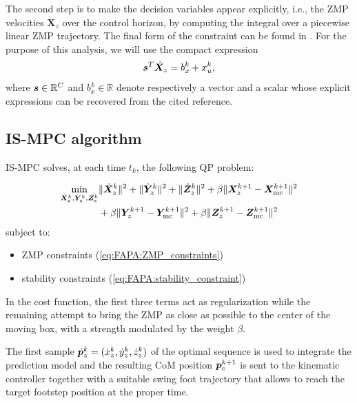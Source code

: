 The second step is to make the decision variables appear explicitly, i.e., the ZMP velocities $\dot{\bm{X}}_z$ over the control horizon, by computing the integral over a piecewise linear ZMP trajectory. The final form of the constraint can be found in \cite{ScDeLaOr:20}. For the purpose of this analysis, we will use the compact expression
\begin{equation}\label{eq:FAPA:stability_constraint}
    {\bm{s}}^T \dot{\bm{X}}_z = b_x^k + x_u^k,
\end{equation}
where ${\bm{s}}\in\mathbb{R}^C$ and $b_x^k\in\mathbb{R}$ denote respectively a vector and a scalar whose explicit expressions can be recovered from the cited reference.

\subsection{IS-MPC algorithm}

IS-MPC solves, at each time $t_k$, the following QP problem:
\begin{braced}
\begin{equation*}\begin{split}
\min_{\dot{\bm{X}}_\text{z}^k, \dot{\bm{Y}}_\text{z}^k, \dot{\bm{Z}}_\text{z}^k}
&\|\dot{\bm{X}}_z^k\|^2 + \|\dot{\bm{Y}}_z^k\|^2 + \|\dot{\bm{Z}}_z^k\|^2+\beta \|\bm{X}_z^{k+1} - {\bm{X}}_{\rm mc}^{k+1}\|^2 \\& + \beta \|\bm{Y}_z^{k+1} - {\bm{Y}}_{\rm mc}^{k+1}\|^2 + \beta \|\bm{Z}_z^{k+1} - {\bm{Z}}_{\rm mc}^{k+1}\|^2 \\
\end{split}\end{equation*}
\hspace{0.25cm} subject to:
\begin{itemize}
\item ZMP constraints (\ref{eq:FAPA:ZMP_constraints})
\item stability constraints (\ref{eq:FAPA:stability_constraint})
\end{itemize}
\end{braced}

\medskip
In the cost function, the first three terms act as regularization while the remaining attempt to bring the ZMP as close as possible to the center of the moving box, with a strength modulated by the weight $\beta$.

The first sample $\dot {{\bm{p}}}_z^k = (\dot x_z^k, \dot y_z^k, \dot z_z^k)$ of the optimal sequence is used to integrate the prediction model and the resulting CoM position ${\bm{p}}_c^{k+1}$ is sent to the kinematic controller together with a suitable swing foot trajectory that allows to reach the target footstep position at the proper time.

